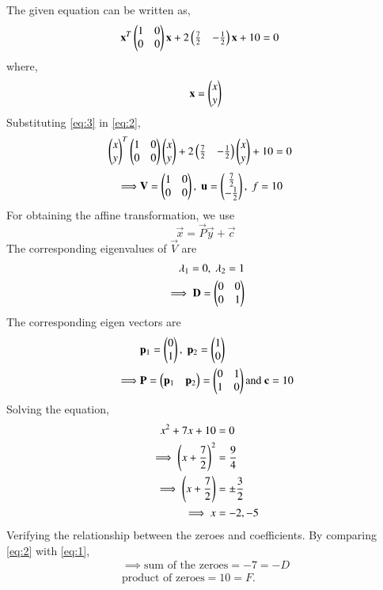 \documentclass[journal,12pt,twocolumn]{IEEEtran}
\begin{document}
The given equation can be written as,
\begin{align}
    \mathbf{x}^T\begin{pmatrix}1 & 0 \\ 0 & 0\end{pmatrix}\mathbf{x} + 2\begin{pmatrix}\frac{7}{2} & -\frac{1}{2}\end{pmatrix}\mathbf{x} + 10 &= 0  \label{eq:2}
\end{align}
where,
\begin{align}
    \mathbf{x} = \begin{pmatrix}x \\ y\end{pmatrix} \label{eq:3}
\end{align}
Substituting \eqref{eq:3} in \eqref{eq:2},
\begin{align}
    \begin{pmatrix}x \\ y\end{pmatrix}^T\begin{pmatrix}1 & 0 \\ 0 & 0\end{pmatrix}\begin{pmatrix}x \\ y\end{pmatrix} + 2\begin{pmatrix}\frac{7}{2} & -\frac{1}{2}\end{pmatrix}\begin{pmatrix}x \\ y\end{pmatrix} + 10 &= 0 
\end{align}
\begin{align}
    \implies &\mathbf{V} = \begin{pmatrix}1&0\\0&0\end{pmatrix},\; \mathbf{u} = \begin{pmatrix}\frac{7}{2}\\-\frac{1}{2}\end{pmatrix},\; f = 10
\end{align}
For obtaining the affine transformation, we use 
\begin{equation}
    \vec{x} = \vec{P}\vec{y}+\vec{c}
\end{equation}
The corresponding eigenvalues of $\vec{V}$ are
\begin{align}
    \lambda_1 = 0,\; \lambda_2 = 1\\
    \implies \mathbf{D} = \begin{pmatrix}0&0\\0&1\end{pmatrix}
\end{align}
The corresponding eigen vectors are
\begin{align}
    &\mathbf{p}_1 = \begin{pmatrix}0\\1\end{pmatrix},\; \mathbf{p}_2 = \begin{pmatrix}1\\0\end{pmatrix}\\
    \implies &\mathbf{P} = \begin{pmatrix}\mathbf{p}_1 & \mathbf{p}_2\end{pmatrix} = \begin{pmatrix}0&1\\1&0\end{pmatrix}\text{and }\mathbf{c}= 10
\end{align}
Solving the equation,
\begin{align}
 x^2 + 7x + 10 &= 0\\
    \implies \left(x + \frac{7}{2}\right)^2 &= \frac{9}{4}\\
    \implies \left(x + \frac{7}{2}\right) &= \pm\frac{3}{2}\label{eq:4}\\
    \implies x  &= -2,-5\label{eq:5}
\end{align}
Verifying the relationship between the zeroes and coefficients. By comparing \eqref{eq:2} with \eqref{eq:1},
\begin{align}
    \implies \text{sum of the zeroes} = -7 = -D\\
    \text{product of zeroes} = 10 = F.
\end{align}
\end{document}
